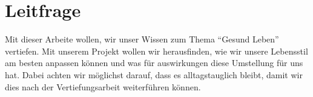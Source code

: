 \chapter{Leitfrage}

Mit dieser Arbeite wollen, wir unser Wissen zum Thema “Gesund Leben” vertiefen. 
\newline
Mit unserem Projekt wollen wir herausfinden, wie wir unsere Lebensstil am besten anpassen können und was für auswirkungen diese Umstellung für uns hat.
\newline
Dabei achten wir möglichst darauf, dass es alltagstauglich bleibt, damit wir dies nach der Vertiefungsarbeit weiterführen können.